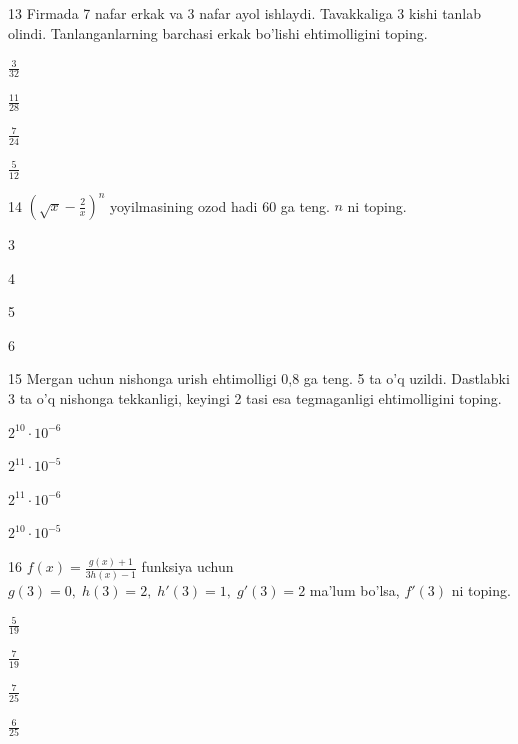 \documentclass[14pt]{article}
\begin{document}
\begin{questionbox}{13}
    Firmada 7 nafar erkak va 3 nafar ayol ishlaydi. Tavakkaliga 3 kishi tanlab olindi. Tanlanganlarning barchasi erkak bo'lishi ehtimolligini toping.
    \begin{options}
        \item \(\frac{3}{32}\)
        \item \(\frac{11}{28}\)
        \item \(\frac{7}{24}\)
        \item \(\frac{5}{12}\)
    \end{options}
\end{questionbox}

\begin{questionbox}{14}
    \(\left( \sqrt{x} - \frac{2}{x} \right)^n\) yoyilmasining ozod hadi 60 ga teng. \(n\) ni toping.
    \begin{options}
        \item 3
        \item 4
        \item 5
        \item 6
    \end{options}
\end{questionbox}

\begin{questionbox}{15}
    Mergan uchun nishonga urish ehtimolligi 0,8 ga teng. 5 ta o'q uzildi. Dastlabki 3 ta o'q nishonga tekkanligi, keyingi 2 tasi esa tegmaganligi ehtimolligini toping.
    \begin{options}
        \item \(2^{10} \cdot 10^{-6}\)
        \item \(2^{11} \cdot 10^{-5}\)
        \item \(2^{11} \cdot 10^{-6}\)
        \item \(2^{10} \cdot 10^{-5}\)
    \end{options}
\end{questionbox}

\begin{questionbox}{16}
    \(f(x) = \frac{g(x)+1}{3h(x)-1}\) funksiya uchun \(g(3) = 0,\; h(3) = 2,\; h'(3) = 1,\; g'(3) = 2\) ma'lum bo'lsa, \(f'(3)\) ni toping.
    \begin{options}
        \item \(\frac{5}{19}\)
        \item \(\frac{7}{19}\)
        \item \(\frac{7}{25}\)
        \item \(\frac{6}{25}\)
    \end{options}
\end{questionbox}
\end{document}
